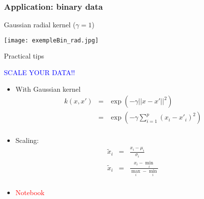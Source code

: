 \begin{frame}
  \frametitle{Application: binary data}

  \begin{block}{Gaussian radial kernel ($\gamma=1$)}
    \begin{center}
      \texttt{[image: exempleBin\_rad.jpg]}\\
    \end{center}
  \end{block}
\end{frame}

\begin{frame}{Practical tips}
  \centerline{\textcolor{blue}{SCALE YOUR DATA!!}}

  \begin{itemize}
  \item With Gaussian kernel
    \begin{eqnarray*}
      k(x,x') &=& \exp{\left( - \gamma ||x - x'||^2\right)}\\
              &=& \exp{\left( - \gamma \sum_{i=1}^p(x_i-x'_i)^2\right)}\\
    \end{eqnarray*}
  \item Scaling:
    \begin{eqnarray*}
      \tilde{x}_i &=& \frac{x_i-\mu_i}{\sigma_i}\\
      \tilde{x}_i &=& \frac{x_i-\min_i}{\max_i-\min_i}\\
    \end{eqnarray*}
  \item \textcolor{red}{Notebook}
  \end{itemize}

\end{frame}

